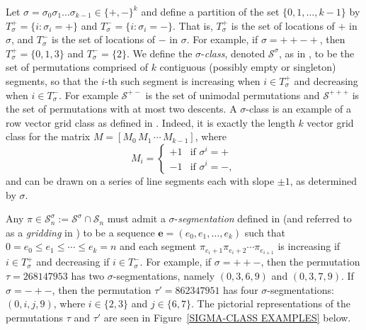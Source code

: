 \documentclass[12pt]{article}
\newcommand{\todo}[1]{\vspace{2 mm}\par\noindent
   \marginpar[\flushright\textsc{ToDo}]{\textsc{ToDo}}\framebox{\begin{minipage}[c]{\textwidth}
   \tt #1 \end{minipage}}\vspace{2 mm}\par}
\DeclareMathOperator{\av}{Av}
\renewcommand{\S}{\mathcal{S}}
\theoremstyle{plain}
\theoremstyle{definition}
\begin{document}
Let $\sigma=\sigma_0\sigma_1\ldots\sigma_{k-1} \in \{+,-\}^k$ and define a partition of the set $\{0,1, \ldots, k-1\}$ by $T_{\sigma}^+=\{i:\sigma_i=+\}$ and $T_{\sigma}^-=\{i:\sigma_i=-\}$. That is, $T_{\sigma}^+$ is the set of locations of $+$ in $\sigma$, and $T_{\sigma}^-$ is the set of locations of $-$ in $\sigma$.  For example, if $\sigma=++-+$, then $T^+_\sigma=\{0,1,3\}$ and $T^-_\sigma=\{2\}$. 
%
%
We define the $\sigma$-\textit{class}, denoted $\mathcal S^\sigma$, as in \cite{AAR, ARCHERELIZALDE2014, AMR}, to be the set of permutations comprised of $k$ contiguous (possibly empty or singleton) segments, so that the $i$-th such segment is increasing when $i\in T_\sigma^+$ and decreasing when $i \in T_\sigma^-$. For example $\S^{+-}$ is the set of unimodal permutations and $\S^{+++}$ is the set of permutations with at most two descents. A $\sigma$-class is an example of a row vector grid class as defined in \cite{AAVRB, HucVat, MurVat}. Indeed, it is exactly the length $k$ vector grid class for the matrix $M = [ M_0 \, M_1 \, \cdots \, M_{k-1}]$, where $$M_i = \begin{cases} +1 & \text{if } \sigma^i = + \\ -1 & \text{if } \sigma^i = -,\end{cases}$$ and can be drawn on a series of line segments each with slope $\pm1$, as determined by $\sigma$.


Any $\pi \in \mathcal S^\sigma_n:=\S^\sigma\cap\S_n$ must admit a $\sigma$-\textit{segmentation} defined in \cite{ARCHERELIZALDE2014} (and referred to as a \textit{gridding} in \cite{AAVRB, BEVAN2014, BEVAN2015}) to be a sequence $\mathbf{e}=(e_0, e_1, \ldots, e_k)$ such that $0=e_0 \leq e_1 \leq \cdots \leq e_k=n$ and each segment $\pi_{e_i+1}\pi_{e_i+2}\cdots\pi_{e_{i+1}}$ is increasing if $i \in T_{\sigma}^+$ and decreasing if $i \in T_{\sigma}^-$.  	
For example, if $\sigma=++-$, then the permutation $\tau=268147953$ has two $\sigma$-segmentations, namely $(0, 3, 6, 9)$ and $(0,3,7,9)$. If $\sigma=-+-$, then the permutation $\tau'=862347951$ has four $\sigma$-segmentations: $(0,i,j,9)$, where $i \in \{2,3\}$ and $j \in \{6,7\}$.
The pictorial representations of the permutations $\tau$ and $\tau'$ are seen in Figure~\ref{SIGMA-CLASS EXAMPLES} below.
\end{document}
